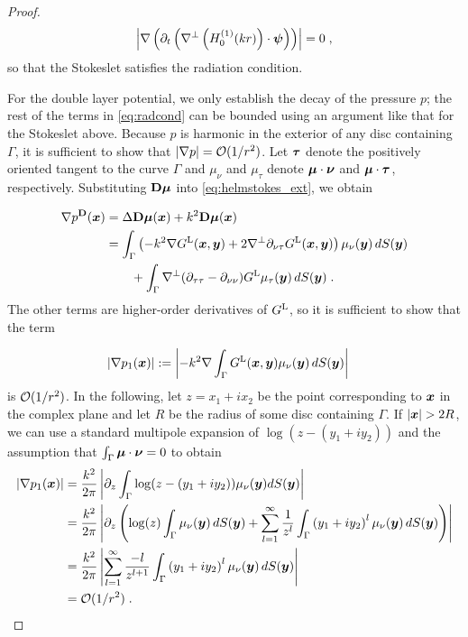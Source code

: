 \begin{proof}
\begin{equation}
\left | \nabla \left( \partial_t \left ( 
\nabla^\perp \left (H_0^{(1)} (kr) \right ) \cdot {\boldsymbol \psi}  \right )
\right) \right | = 0 \; ,
\end{equation}
so that the Stokeslet satisfies the radiation condition.

For the double layer potential, we only establish the
decay of the pressure $p$; the rest of the terms
in \eqref{eq:radcond} can be bounded using an argument
like that for the Stokeslet above.
Because $p$ is harmonic in the exterior of any disc
containing $\Gamma$, it is sufficient to show that
$|\nabla p| = \mathcal{O} (1/r^2)$. Let ${\boldsymbol \tau}$ denote the
positively oriented tangent to the curve $\Gamma$ and
$\mu_\nu$ and $\mu_\tau$ denote ${\boldsymbol \mu} \cdot {\boldsymbol \nu}$ and
${\boldsymbol \mu} \cdot {\boldsymbol \tau}$, respectively. Substituting ${\bf D} {\boldsymbol \mu}$ into
\eqref{eq:helmstokes_ext}, we obtain

\begin{align}
\nabla p^{\bf D}({\boldsymbol x}) &= \Delta {\bf D} {\boldsymbol \mu}({\boldsymbol x}) + k^2 {\bf D}{\boldsymbol \mu}({\boldsymbol x}) \\
&= \int_\Gamma \left (-k^2 \nabla G^{\textrm{L}} ({\boldsymbol x},{\boldsymbol y}) +
2 \nabla^\perp \partial_{\nu\tau} G^{\textrm{L}} ({\boldsymbol x},{\boldsymbol y}) \right ) \mu_\nu({\boldsymbol y})
\, dS({\boldsymbol y}) \\
& \qquad + \int_\Gamma \nabla^\perp (\partial_{\tau\tau}-\partial_{\nu\nu})G^{\textrm{L}} \mu_\tau({\boldsymbol y})
\, dS({\boldsymbol y}) \; .
\end{align}
The other terms are higher-order derivatives
of $G^{\textrm{L}}$, so it is sufficient to show that the term

\begin{align}
|\nabla p_1({\boldsymbol x})| &:= \left |-k^2 \nabla \int_\Gamma G^{\textrm{L}}({\boldsymbol x},{\boldsymbol y})
\mu_\nu({\boldsymbol y}) \, dS({\boldsymbol y}) \right |
\end{align}
is $\mathcal{O} (1/r^2)$. In the following, let $z = x_1 + i x_2$ be the
point corresponding to ${\boldsymbol x}$ in the complex plane and let $R$
be the radius of some disc containing $\Gamma$. If $|{\boldsymbol x}| > 2R$,
we can use a standard multipole expansion of $\log(z-(y_1+iy_2))$
and the assumption that $\int_\Gamma {\boldsymbol \mu} \cdot {\boldsymbol \nu} = 0$
to obtain
\begin{align}
|\nabla p_1({\boldsymbol x})| &= \frac{k^2}{2\pi} \left |  \partial_z \int_\Gamma \log(z-(y_1+iy_2))
\mu_\nu({\boldsymbol y}) dS({\boldsymbol y}) \right | \\
&= \frac{k^2}{2\pi} \left |  \partial_z  \left ( \log(z) \int_\Gamma \mu_\nu({\boldsymbol y}) \, dS({\boldsymbol y})
+ \sum_{l=1}^\infty \frac{1}{z^l} \int_\Gamma \left( y_1+iy_2 \right)^l \mu_\nu({\boldsymbol y}) \, dS({\boldsymbol y})
\right ) \right | \\
&= \frac{k^2}{2\pi} \left | \sum_{l=1}^\infty \frac{-l}{z^{l+1}}
\int_\Gamma \left( y_1+iy_2 \right)^l \mu_\nu({\boldsymbol y}) \, dS({\boldsymbol y}) \right | \\
&= \mathcal{O} (1/r^2) \; .
\end{align}
\end{proof}


